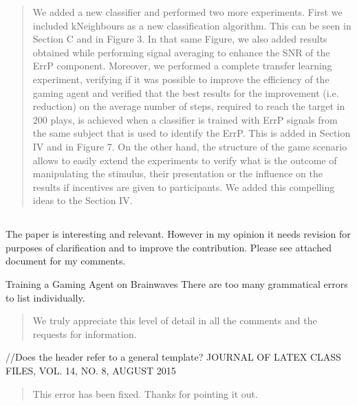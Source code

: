 \documentclass[journal,onecolumn,12pt]{IEEEtran}
\begin{document}
\begin{quotation}
{\color{blue}
We added a new classifier and performed two more experiments.  First we included kNeighbours as a new classification algorithm.  This can be seen in Section C and in Figure 3.  In that same Figure, we also added results obtained while performing signal averaging to enhance the SNR of the ErrP component. Moreover, we performed a complete transfer learning experiment, verifying if it was possible to improve the efficiency of the gaming agent and verified that the best results for the improvement (i.e. reduction) on the average number of steps, required to reach the target in 200 plays, is achieved when a classifier is trained with ErrP signals from the same subject that is used to identify the ErrP.    This is added in Section IV and in Figure 7.
On the other hand, the structure of the game scenario allows to easily extend the experiments to verify what is the outcome of manipulating the stimulus, their presentation or the influence on the results if incentives are given to participants.  We added this compelling ideas to the Section IV.
}
\end{quotation}

\subsection*{}
The paper is interesting and relevant. However in my opinion it needs revision for purposes of clarification and to improve the contribution.
Please see attached document for my comments.

Training a Gaming Agent on Brainwaves
There are too many grammatical errors to list individually.

\vspace{2em}
\begin{quotation}
{\color{blue}
We truly appreciate this level of detail in all the comments and the requests for information. 
}
\end{quotation}
\vspace{2em}

//Does the header refer to a general template?
JOURNAL OF LATEX CLASS FILES, VOL. 14, NO. 8, AUGUST 2015

\vspace{2em}
\begin{quotation}
{\color{blue}
This error has been fixed.  Thanks for pointing it out.
}
\end{quotation}
\vspace{2em}
\end{document}
